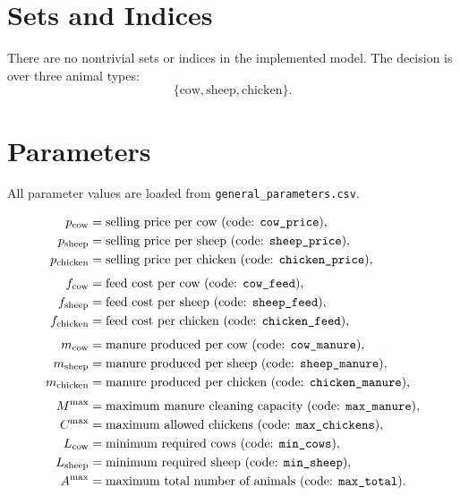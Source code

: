 \section*{Sets and Indices}

There are no nontrivial sets or indices in the implemented model. The decision is over three animal types:
\[
\{\text{cow},\text{sheep},\text{chicken}\}.
\]

\section*{Parameters}

All parameter values are loaded from \texttt{general\_parameters.csv}.

\begin{align*}
p_{\mathrm{cow}} &= \text{selling price per cow (code: \texttt{cow\_price})},\\
p_{\mathrm{sheep}} &= \text{selling price per sheep (code: \texttt{sheep\_price})},\\
p_{\mathrm{chicken}} &= \text{selling price per chicken (code: \texttt{chicken\_price})},\\[4pt]
f_{\mathrm{cow}} &= \text{feed cost per cow (code: \texttt{cow\_feed})},\\
f_{\mathrm{sheep}} &= \text{feed cost per sheep (code: \texttt{sheep\_feed})},\\
f_{\mathrm{chicken}} &= \text{feed cost per chicken (code: \texttt{chicken\_feed})},\\[4pt]
m_{\mathrm{cow}} &= \text{manure produced per cow (code: \texttt{cow\_manure})},\\
m_{\mathrm{sheep}} &= \text{manure produced per sheep (code: \texttt{sheep\_manure})},\\
m_{\mathrm{chicken}} &= \text{manure produced per chicken (code: \texttt{chicken\_manure})},\\[4pt]
M^{\max} &= \text{maximum manure cleaning capacity (code: \texttt{max\_manure})},\\
C^{\max} &= \text{maximum allowed chickens (code: \texttt{max\_chickens})},\\
L_{\mathrm{cow}} &= \text{minimum required cows (code: \texttt{min\_cows})},\\
L_{\mathrm{sheep}} &= \text{minimum required sheep (code: \texttt{min\_sheep})},\\
A^{\max} &= \text{maximum total number of animals (code: \texttt{max\_total})}.
\end{align*}

